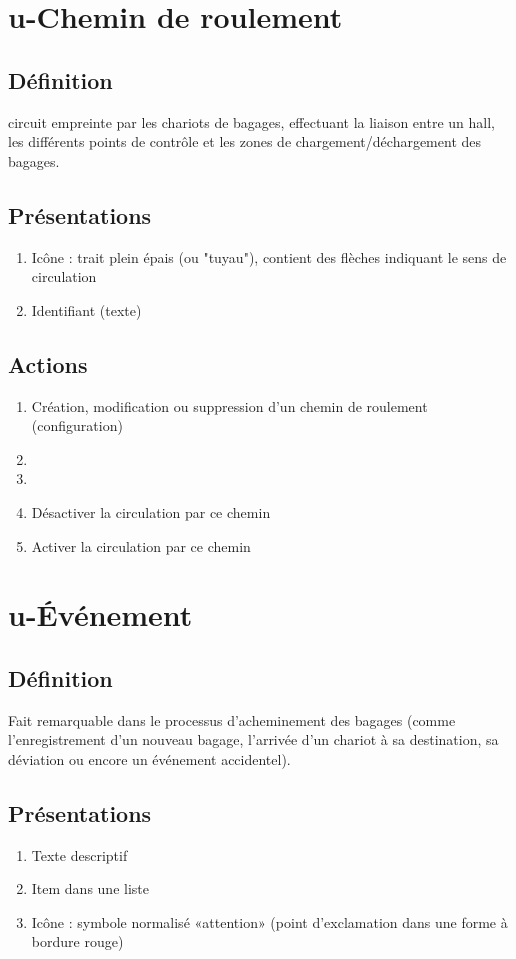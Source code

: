 \section{u-Chemin de roulement}
\subsection{Définition}
	circuit empreinte par les chariots de bagages, effectuant la liaison entre un hall, les différents points de contrôle
	et les zones de chargement/déchargement des bagages.

\subsection{Présentations}
\begin{enumerate}
	\item Icône : trait plein épais (ou "tuyau"), contient des flèches indiquant le sens de circulation
	\item Identifiant (texte)
\end{enumerate}

\subsection{Actions}
\begin{enumerate}
	\item Création, modification ou suppression d'un chemin de roulement (configuration)
	\item \etat
	\item \transit
	\item Désactiver la circulation par ce chemin
	\item Activer la circulation par ce chemin
\end{enumerate}

\section{u-Événement}
\subsection{Définition}
	Fait remarquable dans le processus d'acheminement des bagages (comme l'enregistrement d'un nouveau bagage, l'arrivée
	d'un chariot à sa destination, sa déviation ou encore un événement accidentel).

\subsection{Présentations}
\begin{enumerate}
	\item Texte descriptif
	\item Item dans une liste
	\item Icône : symbole normalisé «attention» (point d'exclamation dans une forme à bordure rouge)
\end{enumerate}

